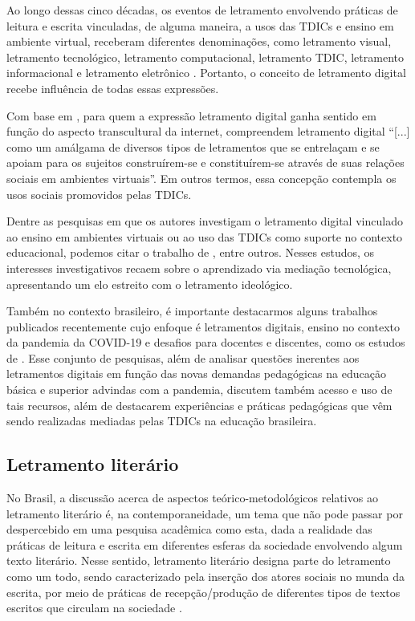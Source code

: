 \documentclass{textolivre}
\begin{document}
Ao longo dessas cinco décadas, os eventos de letramento envolvendo práticas de leitura e escrita vinculadas, de alguma maneira, a usos das TDICs e ensino em ambiente virtual, receberam diferentes denominações, como letramento visual, letramento tecnológico, letramento computacional, letramento TDIC, letramento informacional e letramento eletrônico \cite{araujo_letramento_2014}. Portanto, o conceito de letramento digital recebe influência de todas essas expressões.

Com base em \textcite{buzato_desafios_2007}, para quem a expressão letramento digital ganha sentido em função do aspecto transcultural da internet, \textcite[p. 301]{araujo_letramento_2014} compreendem letramento digital “[...] como um amálgama de diversos tipos de letramentos que se entrelaçam e se apoiam para os sujeitos construírem-se e constituírem-se através de suas relações sociais em ambientes virtuais”. Em outros termos, essa concepção contempla os usos sociais promovidos pelas TDICs.

Dentre as pesquisas em que os autores investigam o letramento digital vinculado ao ensino em ambientes virtuais ou ao uso das TDICs como suporte no contexto educacional, podemos citar o trabalho de \textcite{coscarelli__letramento_2011, signorini_letramentos_2012, komesu_letramentos_2013, araujo_letramento_2014, vidotti_de_rezende_o_2016, ribeiro_tecnologia_2016}, entre outros. Nesses estudos, os interesses investigativos recaem sobre o aprendizado via mediação tecnológica, apresentando um elo estreito com o letramento ideológico.

Também no contexto brasileiro, é importante destacarmos alguns trabalhos publicados recentemente cujo enfoque é letramentos digitais, ensino no contexto da pandemia da COVID-19 e desafios para docentes e discentes, como os estudos de \textcite{almeida_letramento_2020, arruda__educacao_2020, carneiro_uso_2020, silva_letramento_2020}. Esse conjunto de pesquisas, além de analisar questões inerentes aos letramentos digitais em função das novas demandas pedagógicas na educação básica e superior advindas com a pandemia, discutem também acesso e uso de tais recursos, além de destacarem experiências e práticas pedagógicas que vêm sendo realizadas mediadas pelas TDICs na educação brasileira.

\subsection{Letramento literário}\label{sec-literaria}
No Brasil, a discussão acerca de aspectos teórico-metodológicos relativos ao letramento literário é, na contemporaneidade, um tema que não pode passar por despercebido em uma pesquisa acadêmica como esta, dada a realidade das práticas de leitura e escrita em diferentes esferas da sociedade envolvendo algum texto literário. Nesse sentido, letramento literário designa parte do letramento como um todo, sendo caracterizado pela inserção dos atores sociais no munda da escrita, por meio de práticas de recepção/produção de diferentes tipos de textos escritos que circulam na sociedade \cite{paulino_letramento_2001}.
\end{document}
